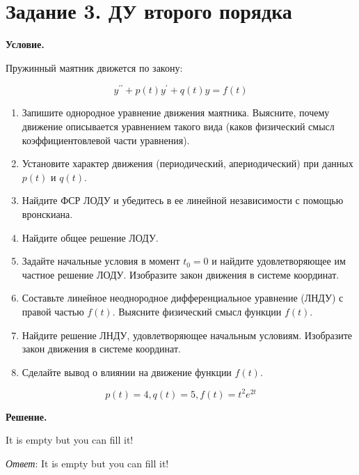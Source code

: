 \section{Задание 3. ДУ второго порядка}

\textbf{Условие.}

Пружинный маятник движется по закону:

\[y^{\prime\prime} + p(t)y^\prime + q(t)y = f(t)\]

\begin{enumerate}
    \item Запишите однородное уравнение движения маятника. Выясните, почему движение описывается уравнением такого вида (каков физический смысл коэффициентовлевой части уравнения).
    \item Установите характер движения (периодический, апериодический) при данных $p(t)$ и $q(t)$.
    \item Найдите ФСР ЛОДУ и убедитесь в ее линейной независимости с помощью вронскиана.
    \item Найдите общее решение ЛОДУ.
    \item Задайте начальные условия в момент $t_0 = 0$ и найдите удовлетворяющее им частное решение ЛОДУ. Изобразите закон движения в системе координат.
    \item Составьте линейное неоднородное дифференциальное уравнение (ЛНДУ) с правой частью $f(t)$. Выясните физический смысл функции $f(t)$.
    \item Найдите решение ЛНДУ, удовлетворяющее начальным условиям. Изобразите закон движения в системе координат.
    \item Сделайте вывод о влиянии на движение функции $f(t)$.
\end{enumerate}

\[p(t) = 4, q(t) = 5, f(t) = t^2 e^{2t}\]

\vspace{10mm}
\textbf{Решение.}

It is empty but you can fill it!

\textit{Ответ}: It is empty but you can fill it!

